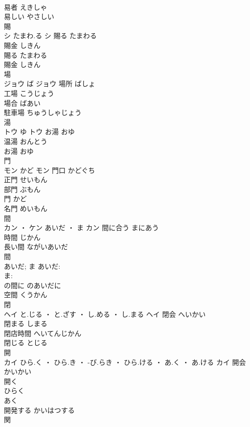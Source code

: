 \documentclass[8pt]{extreport}
\begin{document}
\begin{CJK}{UTF8}{min}
\\	易者	えきしゃ	
\\	易しい	やさしい	
\\	賜	
\\	シ	たまわ.る	シ	賜る	たまわる	
\\	賜金	しきん	
\\	賜る	たまわる	
\\	賜金	しきん	
\\	場	
\\	ジョウ	ば	ジョウ	場所	ばしょ	
\\	工場	こうじょう	
\\	場合	ばあい	
\\	駐車場	ちゅうしゃじょう	
\\	湯	
\\	トウ	ゆ	トウ	お湯	おゆ	
\\	温湯	おんとう	
\\	お湯	おゆ	
\\	門	
\\	モン	かど	モン	門口	かどぐち	
\\	正門	せいもん	
\\	部門	ぶもん	
\\	門	かど	
\\	名門	めいもん	
\\	間	
\\	カン ・ ケン	あいだ ・ ま	カン	間に合う	まにあう	
\\	時間	じかん	
\\	長い間	ながいあいだ	
\\	間 
\\	あいだ; ま	あいだ: 
\\	ま: 
\\	の間に	のあいだに	
\\	空間	くうかん	
\\	閉	
\\	ヘイ	と.じる ・ と.ざす ・ し.める ・ し.まる	ヘイ													閉会	へいかい	
\\	閉まる	しまる	
\\	閉店時間	へいてんじかん	
\\	閉じる	とじる	
\\	開	
\\	カイ	ひら.く ・ ひら.き ・ -び.らき ・ ひら.ける ・ あ.く ・ あ.ける	カイ	開会	かいかい	
\\	開く 
\\	ひらく 
\\	あく	
\\	開発する	かいはつする	
\\	関	

\end{CJK}
\end{document}
